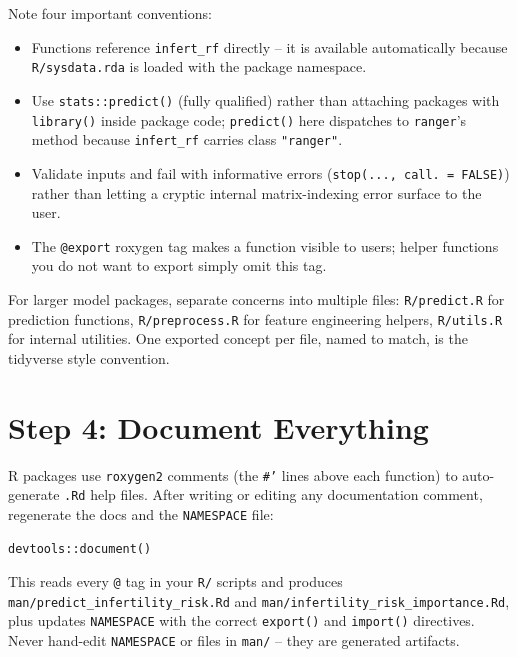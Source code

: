 \documentclass[11pt]{article}
\begin{document}
Note four important conventions:

\begin{itemize}[itemsep=2pt]
  \item Functions reference \texttt{infert\_rf} directly -- it is available automatically because \texttt{R/sysdata.rda} is loaded with the package namespace.
  \item Use \texttt{stats::predict()} (fully qualified) rather than attaching packages with \texttt{library()} inside package code; \texttt{predict()} here dispatches to \texttt{ranger}'s method because \texttt{infert\_rf} carries class \texttt{"ranger"}.
  \item Validate inputs and fail with informative errors (\texttt{stop(..., call. = FALSE)}) rather than letting a cryptic internal matrix-indexing error surface to the user.
  \item The \texttt{@export} roxygen tag makes a function visible to users; helper functions you do not want to export simply omit this tag.
\end{itemize}

\begin{tipbox}
For larger model packages, separate concerns into multiple files: \texttt{R/predict.R} for prediction functions, \texttt{R/preprocess.R} for feature engineering helpers, \texttt{R/utils.R} for internal utilities. One exported concept per file, named to match, is the tidyverse style convention.
\end{tipbox}

\section{Step 4: Document Everything}

R packages use \texttt{roxygen2} comments (the \texttt{\#'} lines above each function) to auto-generate \texttt{.Rd} help files. After writing or editing any documentation comment, regenerate the docs and the \texttt{NAMESPACE} file:

\begin{lstlisting}
devtools::document()
\end{lstlisting}

This reads every \texttt{@} tag in your \texttt{R/} scripts and produces \texttt{man/predict\_infertility\_risk.Rd} and \texttt{man/infertility\_risk\_importance.Rd}, plus updates \texttt{NAMESPACE} with the correct \texttt{export()} and \texttt{import()} directives. Never hand-edit \texttt{NAMESPACE} or files in \texttt{man/} -- they are generated artifacts.
\end{document}
